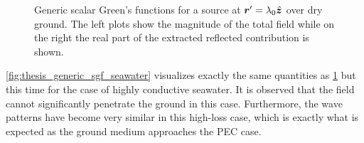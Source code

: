 \begin{figure}
    \caption[Generic scalar Green's function for a source over dry ground]
    {Generic scalar Green's functions for a source at
    $\rsrc = \lambda_0 \uv{z}$ over dry ground.
    The left plots show the magnitude of the total field while on the right
    the real part of the extracted reflected contribution is shown.}
    \label{fig:thesis_generic_sgf_dry_ground}
\end{figure}



\cref{fig:thesis_generic_sgf_seawater} visualizes exactly the same quantities
as \cref{fig:thesis_generic_sgf_dry_ground} but this time for the case of
highly conductive seawater.
It is observed that the field cannot significantly penetrate the ground
in this case.
Furthermore, the wave patterns have become very similar in this high-loss case,
which is exactly what is expected as the ground medium approaches the \ac{PEC}
case.


